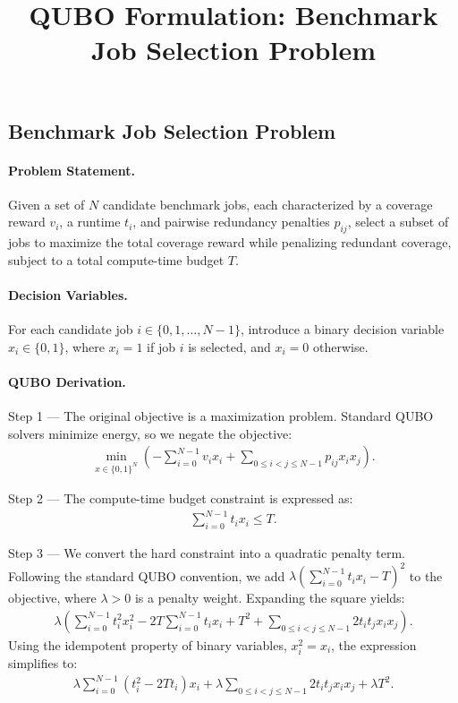 \documentclass[12pt]{article}
\title{QUBO Formulation: Benchmark Job Selection Problem}
\date{}
\begin{document}
\maketitle

\subsection*{Benchmark Job Selection Problem}

\paragraph{Problem Statement.}
Given a set of $N$ candidate benchmark jobs, each characterized by a coverage reward $v_i$, a runtime $t_i$, and pairwise redundancy penalties $p_{ij}$, select a subset of jobs to maximize the total coverage reward while penalizing redundant coverage, subject to a total compute-time budget $T$.

\paragraph{Decision Variables.}
For each candidate job $i \in \{0, 1, \dots, N-1\}$, introduce a binary decision variable $x_i \in \{0,1\}$, where $x_i = 1$ if job $i$ is selected, and $x_i = 0$ otherwise.

\paragraph{QUBO Derivation.}
Step 1 --- The original objective is a maximization problem. Standard QUBO solvers minimize energy, so we negate the objective:
\begin{align}
\min_{x \in \{0,1\}^N} \left( -\sum_{i=0}^{N-1} v_i x_i + \sum_{0 \le i < j \le N-1} p_{ij} x_i x_j \right).
\end{align}

Step 2 --- The compute-time budget constraint is expressed as:
\begin{align}
\sum_{i=0}^{N-1} t_i x_i \le T.
\end{align}

Step 3 --- We convert the hard constraint into a quadratic penalty term. Following the standard QUBO convention, we add $\lambda \left( \sum_{i=0}^{N-1} t_i x_i - T \right)^2$ to the objective, where $\lambda > 0$ is a penalty weight. Expanding the square yields:
\begin{align}
\lambda \left( \sum_{i=0}^{N-1} t_i^2 x_i^2 - 2T \sum_{i=0}^{N-1} t_i x_i + T^2 + \sum_{0 \le i < j \le N-1} 2 t_i t_j x_i x_j \right).
\end{align}
Using the idempotent property of binary variables, $x_i^2 = x_i$, the expression simplifies to:
\begin{align}
\lambda \sum_{i=0}^{N-1} (t_i^2 - 2T t_i) x_i + \lambda \sum_{0 \le i < j \le N-1} 2 t_i t_j x_i x_j + \lambda T^2.
\end{align}
\end{document}
